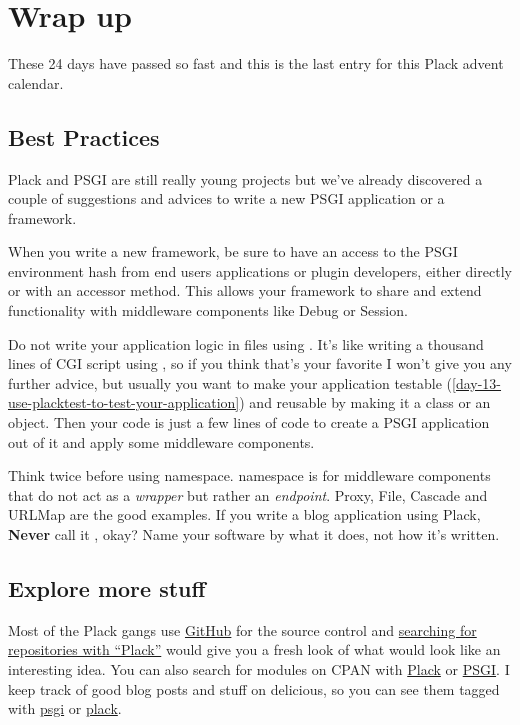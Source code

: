 \chapter{Wrap up}\label{day-24-wrap-up}

These 24 days have passed so fast and this is the last entry for this Plack
advent calendar.

\section{Best Practices}\label{best-practices}

Plack and PSGI are still really young projects but we've already
discovered a couple of suggestions and advices to write a new PSGI
application or a framework.

When you write a new framework, be sure to have an access to the PSGI
environment hash from end users applications or plugin developers,
either directly or with an accessor method. This allows your framework
to share and extend functionality with middleware components like Debug
or Session.

Do not write your application logic in  files using
. It's like writing a thousand lines of CGI script using
, so if you think that's your favorite I won't give you any
further advice, but usually you want to make your application testable
(\autoref{day-13-use-placktest-to-test-your-application})
and reusable by making it a class or an object. Then your
 code is just a few lines of code to create a PSGI
application out of it and apply some middleware components.

Think twice before using  namespace.  namespace
is for middleware components that do not act as a \emph{wrapper} but
rather an \emph{endpoint}. Proxy, File, Cascade and URLMap are the good
examples. If you write a blog application using Plack, \textbf{Never}
call it , okay? Name your software by what it does, not
how it's written.

\section{Explore more stuff}\label{explore-more-stuff}

Most of the Plack gangs use \href{http://github.com/}{GitHub} for the
source control and
\href{http://github.com/search?langOverride=\&q=plack\&repo=\&start_value=1\&type=Repositories}{searching
for repositories with ``Plack''} would give you a fresh look of what
would look like an interesting idea. You can also search for modules on
CPAN with
\href{http://search.cpan.org/search?query=plack\&mode=module}{Plack} or
\href{http://search.cpan.org/search?query=psgi\&mode=module}{PSGI}. I
keep track of good blog posts and stuff on delicious, so you can see
them tagged with \href{http://delicious.com/miyagawa/psgi}{psgi} or
\href{http://delicious.com/miyagawa/plack}{plack}.

